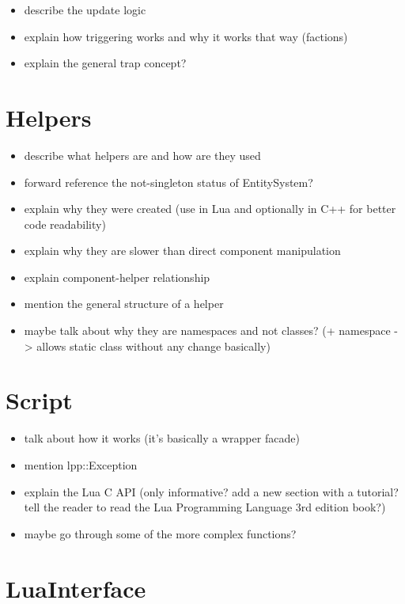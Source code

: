 \begin{itemize}
    \item describe the update logic
    \item explain how triggering works and why it works that way (factions)
    \item explain the general trap concept?
\end{itemize}

\section{Helpers}

\begin{itemize}
    \item describe what helpers are and how are they used
    \item forward reference the not-singleton status of EntitySystem?
    \item explain why they were created (use in Lua and optionally in C++
        for better code readability)
    \item explain why they are slower than direct component manipulation
    \item explain component-helper relationship
    \item mention the general structure of a helper
    \item maybe talk about why they are namespaces and not classes?
        (+ namespace -> allows static class without any change basically)
\end{itemize}

\section{Script}

\begin{itemize}
    \item talk about how it works (it's basically a wrapper facade)
    \item mention lpp::Exception
    \item explain the Lua C API (only informative? add a new section with a tutorial?
        tell the reader to read the Lua Programming Language 3rd edition book?)
    \item maybe go through some of the more complex functions?
\end{itemize}

\section{LuaInterface}

